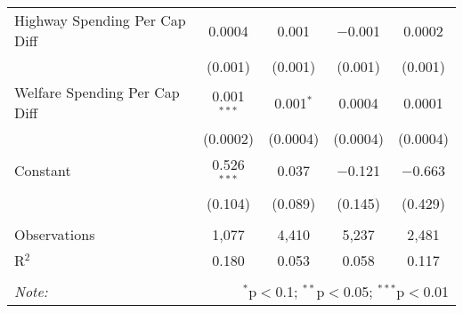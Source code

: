\begin{table}[!htbp]
\begin{tabular}{@{\extracolsep{5pt}}lcccc}
  Highway Spending Per Cap Diff & 0.0004 & 0.001 & $-$0.001 & 0.0002 \\ 
  & (0.001) & (0.001) & (0.001) & (0.001) \\ 
  Welfare Spending Per Cap Diff & 0.001$^{***}$ & 0.001$^{*}$ & 0.0004 & 0.0001 \\ 
  & (0.0002) & (0.0004) & (0.0004) & (0.0004) \\ 
  Constant & 0.526$^{***}$ & 0.037 & $-$0.121 & $-$0.663 \\ 
  & (0.104) & (0.089) & (0.145) & (0.429) \\ 
 \hline \\[-1.8ex] 
Observations & 1,077 & 4,410 & 5,237 & 2,481 \\ 
R$^{2}$ & 0.180 & 0.053 & 0.058 & 0.117 \\ 
\hline 
\hline \\[-1.8ex] 
\textit{Note:}  & \multicolumn{4}{r}{$^{*}$p$<$0.1; $^{**}$p$<$0.05; $^{***}$p$<$0.01} \\ 
\end{tabular} 
\end{table} 
